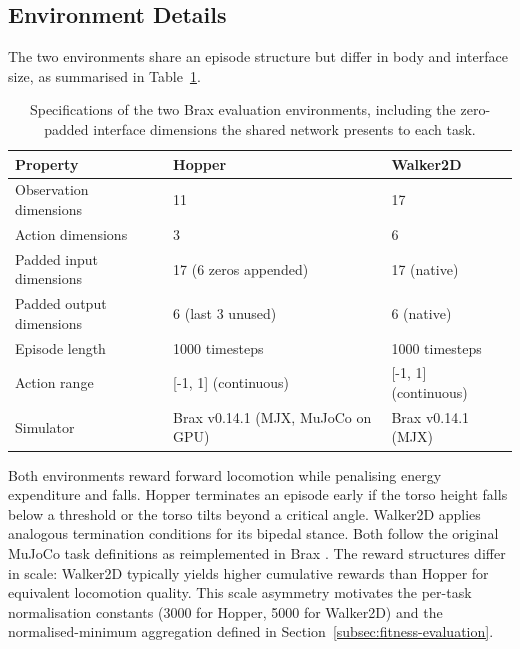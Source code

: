 \documentclass[12pt]{article}
\newcommand{\revAcro}[2]{#2}
\newcommand{\revFig}[2]{#2}
\begin{document}
\subsection{Environment Details}
\label{subsec:environment-details}

The two environments share an episode structure but differ in body and interface size, as summarised in Table~\ref{tab:env-specs}.

\begin{table}[h]
\centering
\caption{\revFig{F-06a}{Specifications of the two Brax evaluation environments, including the zero-padded interface dimensions the shared network presents to each task.}}
\label{tab:env-specs}
\begin{tabular}{lll}
\toprule
\textbf{Property} & \textbf{Hopper} & \textbf{Walker2D} \\
\midrule
Observation dimensions & 11 & 17 \\
Action dimensions & 3 & 6 \\
Padded input dimensions & 17 (6 zeros appended) & 17 (native) \\
Padded output dimensions & 6 (last 3 unused) & 6 (native) \\
Episode length & 1000 timesteps & 1000 timesteps \\
Action range & [-1, 1] (continuous) & [-1, 1] (continuous) \\
\revAcro{A-01}{Simulator} & Brax v0.14.1 (MJX, MuJoCo on GPU) & Brax v0.14.1 (MJX) \\
\bottomrule
\end{tabular}
\end{table}

Both environments reward forward locomotion while penalising energy expenditure and falls.
Hopper terminates an episode early if the torso height falls below a threshold or the torso tilts beyond a critical angle. Walker2D applies analogous termination conditions for its bipedal stance. Both follow the original MuJoCo task definitions \parencite{todorov_mujoco_2012,brockman_openai_2016} as reimplemented in Brax \parencite{freeman_brax_2021}.
The reward structures differ in scale: Walker2D typically yields higher cumulative rewards than Hopper for equivalent locomotion quality.
This scale asymmetry motivates the per-task normalisation constants (3000 for Hopper, 5000 for Walker2D) and the normalised-minimum aggregation defined in Section~\ref{subsec:fitness-evaluation}.
\end{document}
